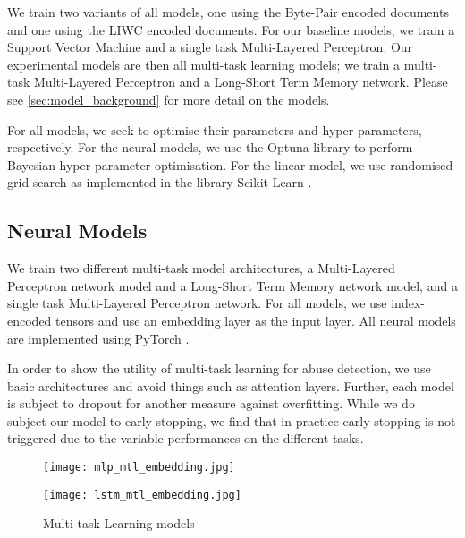 We train two variants of all models, one using the Byte-Pair encoded documents and one using the LIWC encoded documents. For our baseline models, we train a Support Vector Machine and a single task Multi-Layered Perceptron. Our experimental models are then all multi-task learning models; we train a multi-task Multi-Layered Perceptron and a Long-Short Term Memory network. Please see \autoref{sec:model_background} for more detail on the models.

For all models, we seek to optimise their parameters and hyper-parameters, respectively. For the neural models, we use the Optuna library \cite{Optuna:2019} to perform Bayesian hyper-parameter optimisation. For the linear model, we use randomised grid-search as implemented in the library Scikit-Learn \cite{scikit-learn:2019}.

\subsection{Neural Models}

We train two different multi-task model architectures, a Multi-Layered Perceptron network model and a Long-Short Term Memory network model, and a single task Multi-Layered Perceptron network. For all models, we use index-encoded tensors and use an embedding layer as the input layer. All neural models are implemented using PyTorch \cite{CITE: Pytorch paper}.

In order to show the utility of multi-task learning for abuse detection, we use basic architectures and avoid things such as attention layers. Further, each model is subject to dropout for another measure against overfitting.  While we do subject our model to early stopping, we find that in practice early stopping is not triggered due to the variable performances on the different tasks.

\begin{figure}
  \begin{minipage}
    \centering
    \texttt{[image: mlp\_mtl\_embedding.jpg]}
    \label{fig:mlp_mtl_embedding}
  \end{minipage}

  \begin{minipage}
    \centering
    \texttt{[image: lstm\_mtl\_embedding.jpg]}
    \label{fig:lstm_mtl_embedding}
  \end{minipage}
  \caption{Multi-task Learning models}
  \label{fig:mtl_models}
\end{figure}

